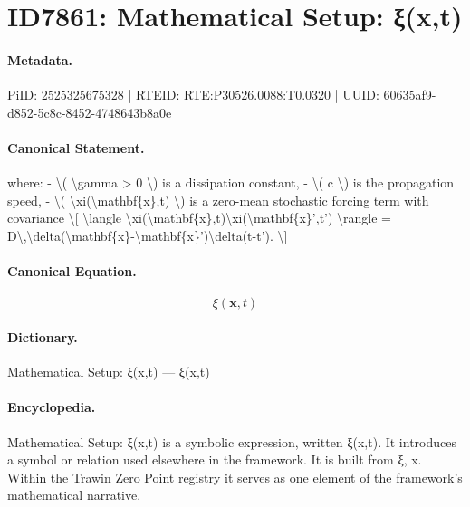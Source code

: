 \section*{ID7861: Mathematical Setup: ξ(x,t)}
\paragraph{Metadata.}
PiID: 2525325675328 | RTEID: RTE:P30526.0088:T0.0320 | UUID: 60635af9-d852-5c8c-8452-4748643b8a0e

\paragraph{Canonical Statement.}
where: - \textbackslash{}( \textbackslash{}gamma > 0 \textbackslash{}) is a dissipation constant, - \textbackslash{}( c \textbackslash{}) is the propagation speed, - \textbackslash{}( \textbackslash{}xi(\textbackslash{}mathbf\{x\},t) \textbackslash{}) is a zero-mean stochastic forcing term with covariance \textbackslash{}[ \textbackslash{}langle \textbackslash{}xi(\textbackslash{}mathbf\{x\},t)\textbackslash{}xi(\textbackslash{}mathbf\{x\}',t') \textbackslash{}rangle = D\textbackslash{},\textbackslash{}delta(\textbackslash{}mathbf\{x\}-\textbackslash{}mathbf\{x\}')\textbackslash{}delta(t-t'). \textbackslash{}]

\paragraph{Canonical Equation.}
\[
\xi(\mathbf{x},t)
\]

\paragraph{Dictionary.}
Mathematical Setup: ξ(x,t) — ξ(x,t)

\paragraph{Encyclopedia.}
Mathematical Setup: ξ(x,t) is a symbolic expression, written ξ(x,t). It introduces a symbol or relation used elsewhere in the framework. It is built from ξ, x. Within the Trawin Zero Point registry it serves as one element of the framework's mathematical narrative.
